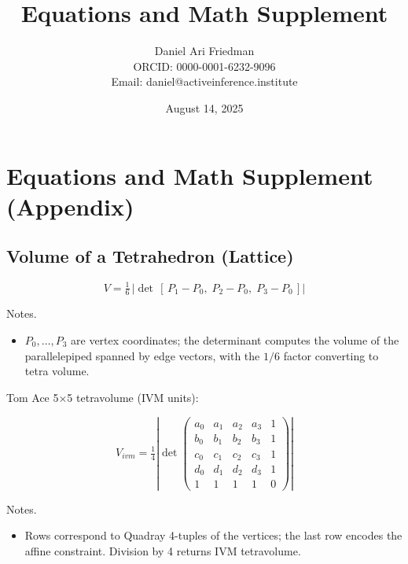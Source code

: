 \documentclass[
  10pt,
]{article}
\title{Equations and Math Supplement}
\author{Daniel Ari Friedman\\ ORCID: 0000-0001-6232-9096\\ Email: daniel@activeinference.institute}
\date{August 14, 2025}
\providecommand{\tightlist}{%
  \setlength{\itemsep}{0pt}\setlength{\parskip}{0pt}}
\begin{document}
\maketitle

{
\hypersetup{linkcolor=red}
\setcounter{tocdepth}{3}
\tableofcontents
}
\hypertarget{equations-and-math-supplement-appendix}{%
\section{Equations and Math Supplement
(Appendix)}\label{equations-and-math-supplement-appendix}}

\hypertarget{volume-of-a-tetrahedron-lattice}{%
\subsection{Volume of a Tetrahedron
(Lattice)}\label{volume-of-a-tetrahedron-lattice}}

\begin{equation}\label{eq:supp_lattice_det}
V = \tfrac{1}{6}\,\left|\det\,[\,P_1 - P_0,\; P_2 - P_0,\; P_3 - P_0\,]\right|
\end{equation}

Notes.

\begin{itemize}
\tightlist
\item
  \(P_0,\ldots,P_3\) are vertex coordinates; the determinant computes
  the volume of the parallelepiped spanned by edge vectors, with the
  \(1/6\) factor converting to tetra volume.
\end{itemize}

Tom Ace 5×5 tetravolume (IVM units):

\begin{equation}\label{eq:supp_ace5x5}
V_{ivm} = \tfrac{1}{4} \left| \det \begin{pmatrix}
 a_0 & a_1 & a_2 & a_3 & 1 \\
 b_0 & b_1 & b_2 & b_3 & 1 \\
 c_0 & c_1 & c_2 & c_3 & 1 \\
 d_0 & d_1 & d_2 & d_3 & 1 \\
  1 & 1 & 1 & 1 & 0
\end{pmatrix} \right|
\end{equation}

Notes.

\begin{itemize}
\tightlist
\item
  Rows correspond to Quadray 4-tuples of the vertices; the last row
  encodes the affine constraint. Division by 4 returns IVM tetravolume.
\end{itemize}
\end{document}
